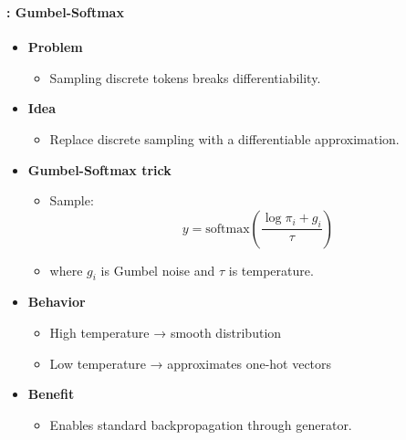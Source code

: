 \documentclass[xcolor=table]{beamer}
\begin{document}
	\begin{frame}
		\frametitle{\insertshortsubtitle}
		\framesubtitle{\insertsection: Gumbel-Softmax}
		
		\begin{itemize}
			
			\item \textbf{Problem}
			\begin{itemize}
				\item Sampling discrete tokens breaks differentiability.
			\end{itemize}
			
			\item \textbf{Idea}
			\begin{itemize}
				\item Replace discrete sampling with a differentiable approximation.
			\end{itemize}
			
			\item \textbf{Gumbel-Softmax trick}
			\begin{itemize}
				\item Sample:
				\[
				y = \mathrm{softmax}\left(\frac{\log \pi_i + g_i}{\tau}\right)
				\]
				\item where \(g_i\) is Gumbel noise and \(\tau\) is temperature.
			\end{itemize}
			
			\item \textbf{Behavior}
			\begin{itemize}
				\item High temperature → smooth distribution
				\item Low temperature → approximates one-hot vectors
			\end{itemize}
			
			\item \textbf{Benefit}
			\begin{itemize}
				\item Enables standard backpropagation through generator.
			\end{itemize}
			
		\end{itemize}
		
	\end{frame}
	
\end{document}
